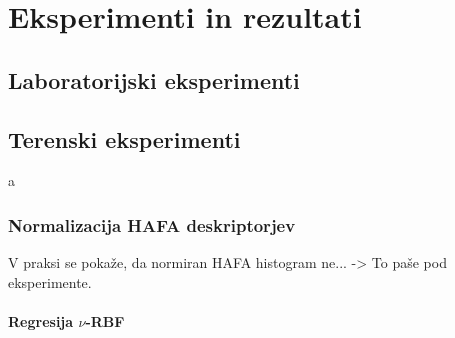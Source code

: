 \chapter{Eksperimenti in rezultati}\label{sec:eksperimenti}
\section{Laboratorijski eksperimenti}
\subsection{}

\section{Terenski eksperimenti}
a

\subsection{Normalizacija HAFA deskriptorjev}
V praksi se pokaže, da normiran HAFA histogram ne... -> To paše pod eksperimente.


\subsubsection{Regresija \texorpdfstring{$\nu$}{nu}-RBF}